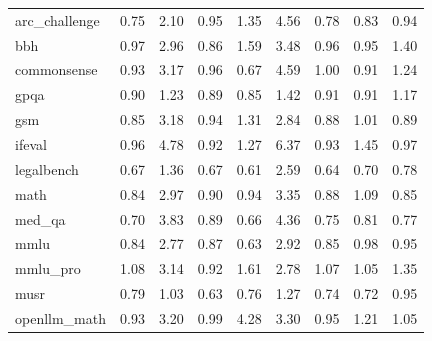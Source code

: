 \begin{tabular}{l cccccccc}
arc\_challenge & 0.75 & 2.10 & 0.95 & 1.35 & 4.56 & 0.78 & 0.83 & 0.94 \\
bbh & 0.97 & 2.96 & 0.86 & 1.59 & 3.48 & 0.96 & 0.95 & 1.40 \\
commonsense & 0.93 & 3.17 & 0.96 & 0.67 & 4.59 & 1.00 & 0.91 & 1.24 \\
gpqa & 0.90 & 1.23 & 0.89 & 0.85 & 1.42 & 0.91 & 0.91 & 1.17 \\
gsm & 0.85 & 3.18 & 0.94 & 1.31 & 2.84 & 0.88 & 1.01 & 0.89 \\
ifeval & 0.96 & 4.78 & 0.92 & 1.27 & 6.37 & 0.93 & 1.45 & 0.97 \\
legalbench & 0.67 & 1.36 & 0.67 & 0.61 & 2.59 & 0.64 & 0.70 & 0.78 \\
math & 0.84 & 2.97 & 0.90 & 0.94 & 3.35 & 0.88 & 1.09 & 0.85 \\
med\_qa & 0.70 & 3.83 & 0.89 & 0.66 & 4.36 & 0.75 & 0.81 & 0.77 \\
mmlu & 0.84 & 2.77 & 0.87 & 0.63 & 2.92 & 0.85 & 0.98 & 0.95 \\
mmlu\_pro & 1.08 & 3.14 & 0.92 & 1.61 & 2.78 & 1.07 & 1.05 & 1.35 \\
musr & 0.79 & 1.03 & 0.63 & 0.76 & 1.27 & 0.74 & 0.72 & 0.95 \\
openllm\_math & 0.93 & 3.20 & 0.99 & 4.28 & 3.30 & 0.95 & 1.21 & 1.05 \\
\bottomrule
\end{tabular}
